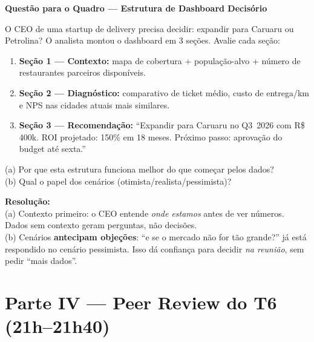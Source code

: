 \begin{SolvedBox}
\textbf{Questão para o Quadro — Estrutura de Dashboard Decisório}

O CEO de uma startup de delivery precisa decidir: expandir para
Caruaru ou Petrolina? O analista montou o dashboard em 3 seções.
Avalie cada seção:

\begin{enumerate}
  \item \textbf{Seção 1 — Contexto:} mapa de cobertura + população-alvo
  + número de restaurantes parceiros disponíveis.
  \item \textbf{Seção 2 — Diagnóstico:} comparativo de ticket médio,
  custo de entrega/km e NPS nas cidades atuais mais similares.
  \item \textbf{Seção 3 — Recomendação:} ``Expandir para Caruaru no
  Q3~2026 com R\$ 400k. ROI projetado: 150\% em 18 meses. Próximo
  passo: aprovação do budget até sexta.''
\end{enumerate}

(a) Por que esta estrutura funciona melhor do que começar pelos dados?\\
(b) Qual o papel dos cenários (otimista/realista/pessimista)?

\textbf{Resolução:}\\
(a) Contexto primeiro: o CEO entende \emph{onde estamos} antes de ver
números. Dados sem contexto geram perguntas, não decisões.\\
(b) Cenários \textbf{antecipam objeções}: ``e se o mercado não for
tão grande?'' já está respondido no cenário pessimista. Isso dá
confiança para decidir \emph{na reunião}, sem pedir ``mais dados''.
\end{SolvedBox}

\section{Parte IV — Peer Review do T6 (21h–21h40)}

